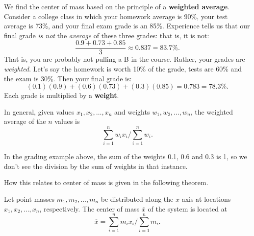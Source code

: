 We find the center of mass based on the principle of a \textbf{weighted average}. Consider a college class in which your homework average is 90\%, your test average is 73\%, and your final exam grade is an 85\%. Experience tells us that our final grade \textit{is not} the \textit{average} of these three grades: that is, it is not:
$$\frac{0.9+0.73+0.85}{3} \approx 0.837 = 83.7\text{\%}.$$
That is, you are probably not pulling a B in the course. Rather, your grades are \textit{weighted}. Let's say the homework is worth 10\% of the grade, tests are 60\% and the exam is 30\%. Then your final grade is:
$$(0.1)(0.9) + (0.6)(0.73)+(0.3)(0.85) = 0.783 = 78.3\text{\%}.$$
Each grade is multiplied by a \textbf{weight}. 

In general, given values $x_1,x_2,\ldots,x_n$ and weights $w_1,w_2,\ldots,w_n$, the weighted average of the $n$ values is
$$\sum_{i=1}^n w_ix_i\Bigg/\sum_{i=1}^n w_i.$$

In the grading example above, the sum of the weights 0.1, 0.6 and 0.3 is 1, so we don't see the division by the sum of weights in that instance.

How this relates to center of mass is given in the following theorem.

{Let point masses $m_1,m_2,\ldots,m_n$ be distributed along the $x$-axis at locations $x_1,x_2,\ldots,x_n$, respectively. The center of mass $\overline{x}$ of the system is located at
$$\overline{x} = \sum_{i=1}^nm_ix_i\Bigg/\sum_{i=1}^n m_i.$$
}

